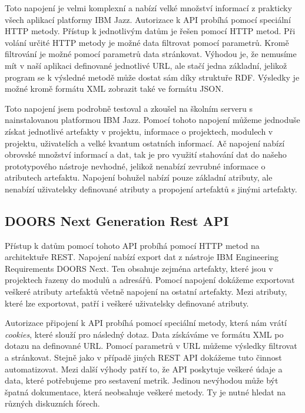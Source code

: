 \documentclass[czech,master]{diploma}
\begin{document}
Toto napojení je velmi komplexní a nabízí velké množství informací z prakticky všech aplikací platformy IBM Jazz. Autorizace k API probíhá pomocí speciální HTTP metody. Přístup k jednotlivým datům je řešen pomocí HTTP metod. Při volání určité HTTP metody je možné data filtrovat pomocí parametrů. Kromě filtrování je možné pomocí parametrů data stránkovat. Výhodou je, že nemusíme mít v naší aplikaci definované jednotlivé URL, ale stačí jedna základní, jelikož program se k výsledné metodě může dostat sám díky struktuře RDF. Výsledky je možné kromě formátu XML zobrazit také ve formátu JSON.

Toto napojení jsem podrobně testoval a zkoušel na školním serveru s nainstalovanou platformou IBM Jazz. Pomocí tohoto napojení můžeme jednoduše získat jednotlivé artefakty v projektu, informace o projektech, modulech v projektu, uživatelích a velké kvantum ostatních informací. Ač napojení nabízí obrovské množství informací a dat, tak je pro využití stahování dat do našeho prototypového nástroje nevhodné, jelikož nenabízí zevrubné informace o atributech artefaktu. Napojení bohužel nabízí pouze základní atributy, ale nenabízí uživatelsky definované atributy a propojení artefaktů s jinými artefakty.

\subsection{DOORS Next Generation Rest API}
Přístup k datům pomocí tohoto API probíhá pomocí HTTP metod na architektuře REST. Napojení nabízí export dat z nástroje IBM Engineering Requirements DOORS Next. Ten obsahuje zejména artefakty, které jsou v projektech řazeny do modulů a adresářů. Pomocí napojení dokážeme exportovat veškeré atributy artefaktů včetně napojení na ostatní artefakty. Mezi atributy, které lze exportovat, patří i veškeré uživatelsky definované atributy.

Autorizace připojení k API probíhá pomocí speciální metody, která nám vrátí \textit{cookies}, které slouží pro následný dotaz. Data získáváme ve formátu XML po dotazu na definované URL. Pomocí parametrů v URL můžeme výsledky filtrovat a stránkovat. Stejně jako v případě jiných REST API dokážeme tuto činnost automatizovat. Mezi další výhody patří to, že API poskytuje veškeré údaje a data, které potřebujeme pro sestavení metrik. Jedinou nevýhodou může být špatná dokumentace, která neobsahuje veškeré metody. Ty je nutné hledat na různých diskuzních fórech.
\end{document}

